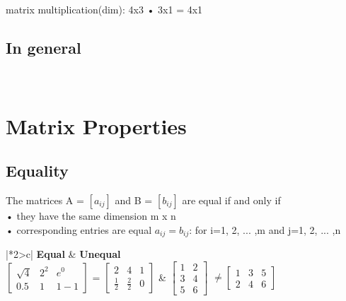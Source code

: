 \documentclass{article}
\begin{document}
\centerline{matrix multiplication(dim): 4x3 • 3x1 = 4x1}

\subsection{In general}
 \\

\section{Matrix Properties}
\subsection{Equality}
The matrices A = $[a_{ij}]$ and B = $[b_{ij}]$ are equal if and only if \\ 
• they have the same dimension m x n \\ 
• corresponding entries are equal $a_{ij} = b_{ij}$: for i=1, 2, ... ,m and j=1, 2, ... ,n 


\begin{center}
    \renewcommand{\arraystretch}{4}

    \begin{tabular}{|*2{>{\renewcommand{\arraystretch}{1}}c|}}
    \hline
    \textbf{Equal} & \textbf{Unequal}\\
    \hline
    $ \left[ \begin{array}{ccc} \sqrt{4} & 2^2 & e^0 \\ 0.5 & 1 & 1-1 \end{array}\right]$ = $ \left[ \begin{array}{ccc} 2 & 4 & 1 \\ \frac{1}{2} & \frac{2}{2} & 0 \end{array}\right]$  & 
    $ \left[ \begin{array}{cc} 1 & 2 \\ 3 & 4 \\ 5 & 6 \end{array}\right]$ $\neq \left[ \begin{array}{ccc} 1 & 3 & 5 \\ 2 & 4 & 6 \end{array}\right]$ \\
    \hline
    \end{tabular} 
\end{center}
\end{document}
